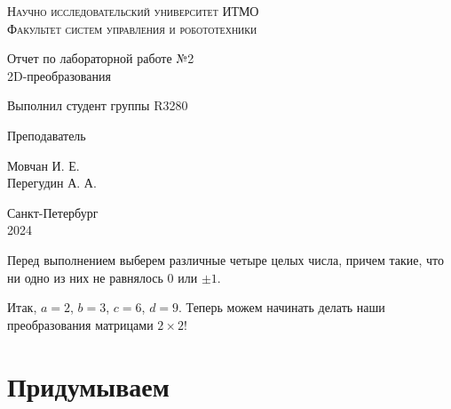 \documentclass[a4paper,hidelinks,14pt]{extarticle}
\begin{document}
	\begin{titlepage}
		
		\setlength{\parindent}{0ex}
		
		\begin{center}
			\textsc{
				\vspace{1ex}
				Научно исследовательский университет ИТМО \\
				\vspace{0.5ex}
				Факультет систем управления и робототехники \\
				\vspace{0.5ex}
			}
		\end{center}
		
		\vspace{50mm}
		
		\begin{center}
			Отчет по лабораторной работе №2 \\
			2D-преобразования
		\end{center}
		
		\vspace{50mm}
		
		\begin{minipage}{.55\linewidth}
			Выполнил студент группы R3280
			
			\smallskip
			
			Преподаватель
		\end{minipage}
		\hfill
		\begin{minipage}{.4\linewidth}
			\begin{flushright}
				Мовчан И. Е.
				\\
				Перегудин А. А.
			\end{flushright}
		\end{minipage}
		
		\vfill
		\begin{center}
			Санкт-Петербург
			\\
			2024
		\end{center}
		
	\end{titlepage}
	
	Перед выполнением выберем различные четыре целых числа, причем такие, что ни одно из них не равнялось $0$ или $\pm1$.
	
	Итак, $a=2$, $b=3$, $c=6$, $d=9$. Теперь можем начинать делать наши преобразования матрицами $2\times2$!
	
	\section{Придумываем}
\end{document}
